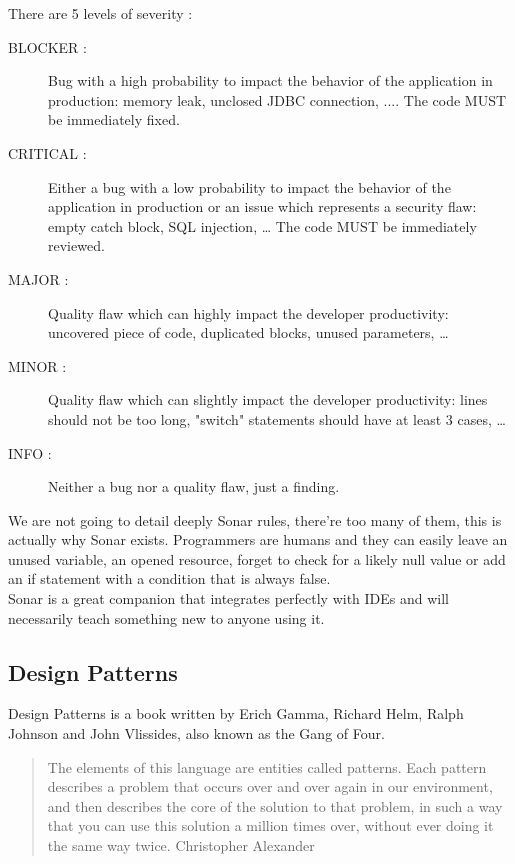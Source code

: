 There are 5 levels of severity :

\begin{description}
    \item[BLOCKER :]
Bug with a high probability to impact the behavior of the application
in production: memory leak, unclosed JDBC connection, ....
The code MUST be immediately fixed.
    \item[CRITICAL :]
Either a bug with a low probability to impact the behavior of the
application in production or an issue which represents a
security flaw: empty catch block, SQL injection, \ldots
The code MUST be immediately reviewed.
    \item[MAJOR :]
Quality flaw which can highly impact the developer productivity:
uncovered piece of code, duplicated blocks, unused parameters,
    \ldots
    \item[MINOR :]
Quality flaw which can slightly impact the developer productivity:
lines should not be too long, "switch" statements should have at
least 3 cases, \ldots
    \item[INFO :]
Neither a bug nor a quality flaw, just a finding.
\end{description}

We are not going to detail deeply Sonar rules, there're too many of them,
this is actually why Sonar exists.
Programmers are humans and they can easily leave an unused variable, an
opened resource, forget to check for a likely null value or add an if
statement with a condition that is always false. \\
Sonar is a great companion that integrates perfectly with IDEs and will
necessarily teach something new to anyone using it.

\subsection{Design Patterns}\label{subsec:design-patterns}
Design Patterns is a book written by Erich Gamma,
Richard Helm, Ralph Johnson and John Vlissides, also known as the
Gang of Four.
\begin{quotation}
    The elements of this language are entities called patterns.
    Each pattern describes a problem that occurs over and over again
    in our environment, and then describes the core of the solution to
    that problem, in such a way that you can use this solution a million
    times over, without ever doing it the same way twice.
    \textemdash Christopher Alexander
\end{quotation}

